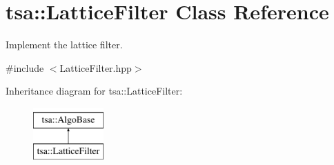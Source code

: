 \hypertarget{classtsa_1_1_lattice_filter}{}\section{tsa\+:\+:Lattice\+Filter Class Reference}
\label{classtsa_1_1_lattice_filter}


Implement the lattice filter.  




{\ttfamily \#include $<$Lattice\+Filter.\+hpp$>$}

Inheritance diagram for tsa\+:\+:Lattice\+Filter\+:\begin{figure}[H]
\begin{center}
\leavevmode
\includegraphics[height=2.000000cm]{classtsa_1_1_lattice_filter}
\end{center}
\end{figure}
